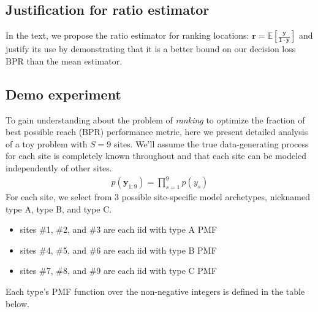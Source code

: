 \subsection{Justification for ratio estimator}

In the text, we propose the ratio estimator for ranking locations: $\bm{r} = \mathbb{E}[ \frac{ \bm{y} }{ \bm{1} \cdot \bm{y} } ]$ and justify its use by demonstrating that it is a better bound on our decision loss BPR than the mean estimator. 


\subsection{Demo experiment}
To gain understanding about the problem of \emph{ranking} to optimize the fraction of best possible reach (BPR) performance metric, here we present detailed analysis of a toy problem with $S=9$ sites. We'll assume the true data-generating process for each site is completely known throughout and that each site can be modeled independently of other sites.
\begin{align}
    p( \bm{y}_{1:9} ) = \prod_{s=1}^9 p(y_s)
\end{align}
For each site, we select from 3 possible site-specific model archetypes, nicknamed type A, type B, and type C. 
\begin{itemize}
    \item sites \#1, \#2, and \#3 are each iid with type A PMF
    \item sites \#4, \#5, and \#6 are each iid with type B PMF
    \item sites \#7, \#8, and \#9 are each iid with type C PMF
\end{itemize}
Each type's PMF function over the non-negative integers is defined in the table below.

